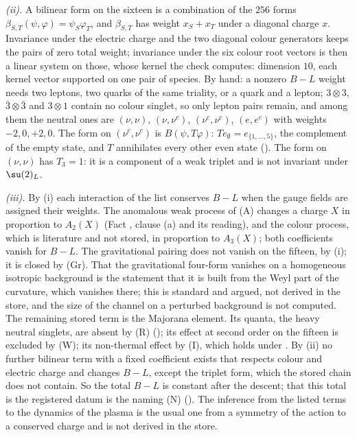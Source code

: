 \emph{(ii).} A bilinear form on the sixteen is a combination of the $256$ forms $\beta_{S,T}(\psi, \varphi) = \psi_{S}\varphi_{T}$, and $\beta_{S,T}$ has weight $x_{S} + x_{T}$ under a diagonal charge $x$. Invariance under the electric charge and the two diagonal colour generators keeps the pairs of zero total weight; invariance under the six colour root vectors is then a linear system on those, whose kernel the check computes: dimension $10$, each kernel vector supported on one pair of species. By hand: a nonzero $B - L$ weight needs two leptons, two quarks of the same triality, or a quark and a lepton; $3 \otimes 3$, $\bar{3} \otimes \bar{3}$ and $3 \otimes 1$ contain no colour singlet, so only lepton pairs remain, and among them the neutral ones are $(\nu, \nu)$, $(\nu, \nu^{c})$, $(\nu^{c}, \nu^{c})$, $(e, e^{c})$ with weights $-2, 0, +2, 0$. The form on $(\nu^{c}, \nu^{c})$ is $B(\psi, T\varphi)$: $Te_{\emptyset} = e_{\{1,\dots,5\}}$, the complement of the empty state, and $T$ annihilates every other even state (). The form on $(\nu, \nu)$ has $T_{3} = 1$: it is a component of a weak triplet and is not invariant under $\su(2)_{L}$.

\emph{(iii).} By (i) each interaction of the list conserves $B - L$ when the gauge fields are assigned their weights. The anomalous weak process of (A) changes a charge $X$ in proportion to $A_{2}(X)$ (Fact , clause (a) and its reading), and the colour process, which is literature and not stored, in proportion to $A_{3}(X)$; both coefficients vanish for $B - L$. The gravitational pairing does not vanish on the fifteen, by (i); it is closed by (Gr). That the gravitational four-form vanishes on a homogeneous isotropic background is the statement that it is built from the Weyl part of the curvature, which vanishes there; this is standard and argued, not derived in the store, and the size of the channel on a perturbed background is not computed. The remaining stored term is the Majorana element. Its quanta, the heavy neutral singlets, are absent by (R) (); its effect at second order on the fifteen is excluded by (W); its non-thermal effect by (I), which holds under . By (ii) no further bilinear term with a fixed coefficient exists that respects colour and electric charge and changes $B - L$, except the triplet form, which the stored chain does not contain. So the total $B - L$ is constant after the descent; that this total is the registered datum is the naming (N) (). The inference from the listed terms to the dynamics of the plasma is the usual one from a symmetry of the action to a conserved charge and is not derived in the store.

